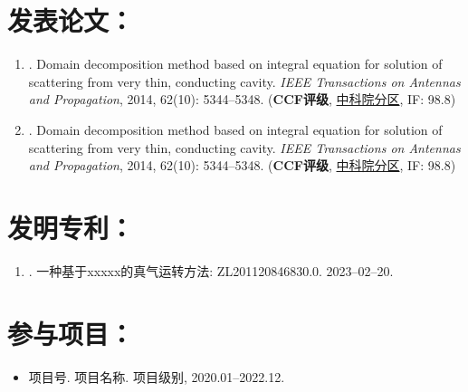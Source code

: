 \documentclass[doctor, vlined, ]{DissertUESTC}
\begin{document}
	\section*{发表论文：}
	
	\begin{enumerate}
		
	    \item {}. Domain decomposition method based on integral equation for solution of scattering from very thin, conducting cavity. \emph{IEEE Transactions on Antennas and Propagation}, 2014, 62(10): 5344--5348. (\textbf{CCF评级}, \underline{中科院分区}, IF: 98.8)
	    
		\setcounter{enumi}{98}
	    
		\item {}. Domain decomposition method based on integral equation for solution of scattering from very thin, conducting cavity. \emph{IEEE Transactions on Antennas and Propagation}, 2014, 62(10): 5344--5348. (\textbf{CCF评级}, \underline{中科院分区}, IF: 98.8)
	\end{enumerate}
	
	\newpage%
	\section*{发明专利：}
	
	\begin{enumerate}
		
		\item {}. 一种基于xxxxx的真气运转方法: ZL201120846830.0. 2023--02--20.
		
	\end{enumerate}
	
	\section*{参与项目：}
	
	\begin{itemize}
		\item 项目号. 项目名称. 项目级别, 2020.01--2022.12.
	\end{itemize}


\end{document}
